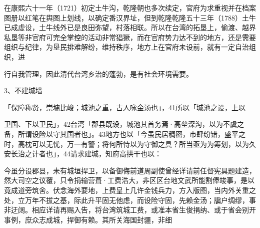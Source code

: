 在康熙六十一年（1721）初定土牛沟，乾隆朝也多次续定，官府为求重视并在档案图册以红笔在舆图上划线，以确定番汉界址，但到乾隆乾隆五十三年（1788）土牛已成虚设，土牛线外已是良田弥望，村落相联。所以在台湾的拓垦上，偷渡、越界私垦等非官府可完全掌控的活动非常猖獗，而在官府势力达不到的地方，还是需要组织与纪律，为垦民排难解纷，维持秩序，地方上在官府未设前，就有一定自治组织，进

\vfill
\begin{BookNotes}
\end{BookNotes}

\noindent 行自我管理，因此清代台湾乡治的蓬勃，是有社会环境需要。

3、不建城墙

\begin{BookQuote}
「保障称贤，崇墉比峻；城池之重，古人咏金汤也」，41所以「城池之设，上以
\end{BookQuote}

卫国、下以卫民」，42台湾「郡县既设，城池其首务焉·高垒深沟，以为不虞之备，所谓设险以守其国者也」。43地方也以「今虽民居稠密，市肆纷错，盛平之时，高枕可以无忧，万一有警；将何所恃以为守御之具？所当亟为为筹划，以为久安长治之计者也」，44请求建城，知府高拱干也以：

\begin{BookQuote}
今虽分设郡县，未有城垣捍卫，以备御侮前道周副使曾经详请前任督宪具题建造，然大司空之议覆，只令捐输营葺·工费浩大，非区区台地文武所能割俸竣事，是以竟成道旁筑舍。伏念海外要地，上费皇上几许金钱兵力，方入版图，当内外关重之处，立万年不拔之基，际此升平固无他虑，而设险守固，先赖金汤；牖户绸缪，事非迂阔。相应详请再赐入告，将台湾筑城工费，或准本省生俊捐纳、或于省会别开事例，庶众志成城，捍御有赖。其所关海国封疆，非细
\end{BookQuote}

